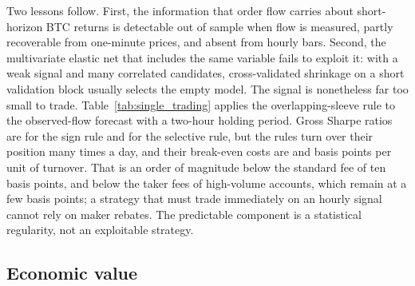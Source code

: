 Two lessons follow. First, the information that order flow carries about short-horizon BTC returns
is detectable out of sample when flow is measured, partly recoverable from one-minute prices, and
absent from hourly bars. Second, the multivariate elastic net that includes the same variable fails
to exploit it: with a weak signal and many correlated candidates, cross-validated shrinkage on a short
validation block usually selects the empty model. The signal is nonetheless far too small to trade.
Table~\ref{tab:single_trading} applies the overlapping-sleeve rule to the observed-flow forecast with a
two-hour holding period. Gross Sharpe ratios are \BTCstSRsign{} for the sign rule and
\BTCstSRselective{} for the selective rule, but the rules turn over their position many times a day,
and their break-even costs are \BTCstBEsign{} and \BTCstBEselective{} basis points per unit of
turnover. That is an order of magnitude below the standard fee of ten basis points, and below the
taker fees of high-volume accounts, which remain at a few basis points; a strategy that must trade
immediately on an hourly signal cannot rely on maker rebates. The predictable component is a
statistical regularity, not an exploitable strategy.

\subsection{Economic value}

\begin{table}[t]
\centering\caption{Trading performance of forecast-based rules, BTC/USDT}\label{tab:backtest}
\resizebox{\textwidth}{!}{}
\end{table}

